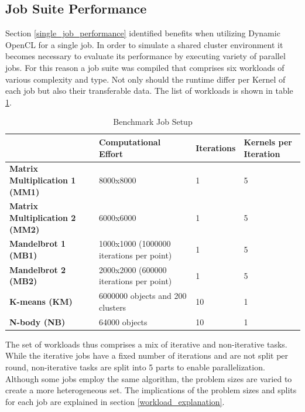 \subsection{Job Suite Performance}

Section \ref{single_job_performance} identified benefits when utilizing Dynamic OpenCL for a single job. In order to simulate a shared cluster environment it becomes necessary to evaluate its performance by executing variety of parallel jobs. For this reason a job suite was compiled that comprises six workloads of various complexity and type. Not only should the runtime differ per Kernel of each job but also their transferable data. The list of workloads is shown in table \ref{table:benchmark_job_setup}.

\begin{table}[!htb]
	\centering
	\begin{adjustbox}{width=0.95\textwidth}
		\small
		\begin{tabular}{l | l | l | l}
			~							& \textbf{Computational Effort}		& \textbf{Iterations}	& \textbf{Kernels per Iteration} \\
			\hline
			\textbf{Matrix Multiplication 1 (MM1)} 	& 8000x8000  								& 1 	& 5 \\
			\textbf{Matrix Multiplication 2 (MM2)}     & 6000x6000  								& 1		& 5 \\
			\textbf{Mandelbrot 1 (MB1)}     			& 1000x1000 (1000000 iterations per point) 	& 1		& 5 \\
			\textbf{Mandelbrot 2 (MB2)}     			& 2000x2000 (600000 iterations per point)  	& 1		& 5 \\
			\textbf{K-means (KM)}          			& 6000000 objects and 200 clusters  		& 10	& 1 \\
			\textbf{N-body (NB)}    		 			& 64000 objects  							& 10	& 1 \\		
		\end{tabular}
	\end{adjustbox}
	
	\caption{Benchmark Job Setup}
	\label{table:benchmark_job_setup}
\end{table}

The set of workloads thus comprises a mix of iterative and non-iterative tasks. While the iterative jobs have a fixed number of iterations and are not split per round, non-iterative tasks are split into 5 parts to enable parallelization. Although some jobs employ the same algorithm, the problem sizes are varied to create a more heterogeneous set. The implications of the problem sizes and splits for each job are explained in section \ref{workload_explanation}.

